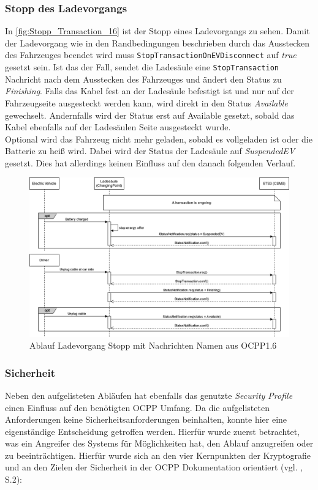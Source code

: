 \subsubsection{Stopp des Ladevorgangs}
In \autoref{fig:Stopp_Transaction_16} ist der Stopp eines Ladevorgangs zu sehen. Damit der Ladevorgang wie in den Randbedingungen beschrieben durch das Ausstecken des Fahrzeuges beendet wird muss \verb|StopTransactionOnEVDisconnect| auf \textit{true} gesetzt sein. Ist das der Fall, sendet die Ladesäule eine \verb|StopTransaction| Nachricht nach dem Ausstecken des Fahrzeuges und ändert den Status zu \textit{Finishing}.
Falls das Kabel fest an der Ladesäule befestigt ist und nur auf der Fahrzeugseite ausgesteckt werden kann, wird direkt in den Status \textit{Available} gewechselt. Andernfalls wird der Status erst auf Available gesetzt, sobald das Kabel ebenfalls auf der Ladesäulen Seite ausgesteckt wurde. \\
\noindent Optional wird das Fahrzeug nicht mehr geladen, sobald es vollgeladen ist oder die Batterie zu heiß wird. Dabei wird der Status der Ladesäule auf \textit{SuspendedEV} gesetzt. Dies hat allerdings keinen Einfluss auf den danach folgenden Verlauf.
\begin{figure}[H]
	\centering
	\includegraphics[width=1.0\textwidth]{images/OCPP/Charging_stop_OCPP_v16.drawio.png}
	\caption{Ablauf Ladevorgang Stopp mit Nachrichten Namen aus OCPP1.6 \cite{Eigene_Darstellung, OCPP-1.6-edition-2}}
	\label{fig:Stopp_Transaction_16}
\end{figure}

\subsubsection{Sicherheit}
Neben den aufgelisteten Abläufen hat ebenfalls das genutzte \textit{Security Profile} einen Einfluss auf den benötigten OCPP Umfang. Da die aufgelisteten Anforderungen keine Sicherheitsanforderungen beinhalten, konnte hier eine eigenständige Entscheidung getroffen werden. Hierfür wurde zuerst betrachtet, was ein Angreifer des Systems für Möglichkeiten hat, den Ablauf anzugreifen oder zu beeinträchtigen. Hierfür wurde sich an den vier Kernpunkten der Kryptografie und an den Zielen der Sicherheit in der OCPP Dokumentation orientiert (vgl. \cite{OCPP-1.6-security-whitepaper-edition-3}, S.2):

